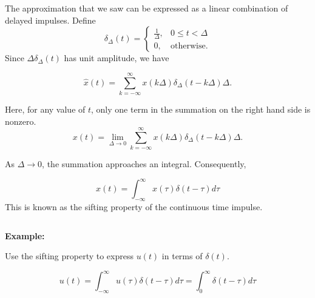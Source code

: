\begin{frame}
    The approximation that we saw can be expressed as a linear combination of delayed impulses. Define
    \begin{equation*}
        \delta_\Delta(t) = \begin{cases}\frac{1}{\Delta}, & 0 \leq t < \Delta\\0, & \text{otherwise}.        \end{cases}
    \end{equation*}
    Since $\Delta \delta_\Delta(t)$ has unit amplitude, we have
    {
    \begin{equation*}
        \hat{x}(t) = \sum_{k=-\infty}^{\infty} x(k\Delta)\delta_\Delta(t - k\Delta)\Delta.
    \end{equation*}

    Here, for any value of $t$, only one term in the summation on the right hand side is nonzero.
    \begin{equation*}
        x(t) = \lim_{\Delta \rightarrow 0}\sum_{k=-\infty}^{\infty} x(k\Delta)\delta_\Delta(t - k\Delta)\Delta.
    \end{equation*}
    }
    {
        \vspace{1.5in}
    }
    As ${\Delta \rightarrow 0}$, the summation approaches an integral. Consequently,

    \begin{equation*}
        x(t) = \int_{-\infty}^{\infty} x(\tau)\delta(t - \tau)d\tau
    \end{equation*}
    This is known as the \alert{sifting property} of the continuous time impulse.

    {
        \begin{columns}
        \end{columns}
    }
\end{frame}



\begin{frame}{}
\textbf{ Example:}\par
Use the sifting property to express $u(t)$ in terms of $\delta(t)$.
\pause
    {
        \begin{equation*}
            u(t) = \int_{-\infty}^{\infty} u(\tau)\delta(t - \tau)d\tau = \int_{0}^{\infty} \delta(t - \tau)d\tau
        \end{equation*}
        \begin{columns}


        \end{columns}
    }
\end{frame}



